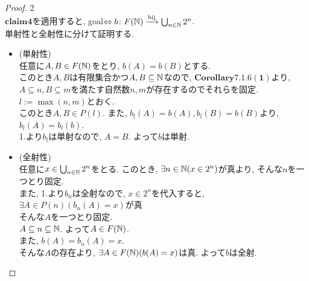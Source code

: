   \begin{proof} 2\\
  $\mathbf{claim4}$を適用すると,
  goal$\Leftrightarrow b\colon F(\mathbb{N}) \xrightarrow{\text{bij}} \bigcup _{n \in \mathbb{N}} 2^n$.\\
  単射性と全射性に分けて証明する.
    \begin{itemize}
      \item[]\hspace{-0.5cm} (単射性)\\
        任意に$A,B \in F(\mathbb{N})$をとり,
        $b(A) = b(B)$とする.\\
        このとき$A,B$は有限集合かつ$A,B \subseteq \mathbb{N}$なので,
        $\mathbf{Corollary7.1.6(1)}$より,
        $A \subseteq n, B \subseteq m$を満たす自然数$n,m$が存在するのでそれらを固定.\\
        $l := \operatorname{max}(n,m)$とおく.\\
        このとき$A,B \in P(l)$.
        また,
        $b_l(A) = b(A), b_l(B) = b(B)$より,
        $b_l(A) = b_l(b)$.\\
        1.より$b_l$は単射なので,
        $A = B$.
        よって$b$は単射.
      \item[]\hspace{-0.5cm} (全射性)\\
        任意に$x \in \bigcup _{n \in \mathbb{N}} 2^n$をとる.
        このとき,
        $\exists n \in \mathbb{N}(x \in 2^n)$が真より,
        そんな$n$を一つとり固定.\\
        また,
        1.より$b_n$は全射なので,
        $x \in 2^n$を代入すると,
        $\exists A \in P(n)(b_n(A) = x)$が真\\
        そんな$A$を一つとり固定.\\
        $A \subseteq n \subseteq \mathbb{N}$.
        よって$A \in F(\mathbb{N})$.\\
        また,
        $b(A) = b_n(A) = x$.\\ 
        そんな$A$の存在より,
        $\exists A \in F(\mathbb{N}) (b(A) = x)$は真.
        よって$b$は全射.
    \end{itemize}
\end{proof} 
